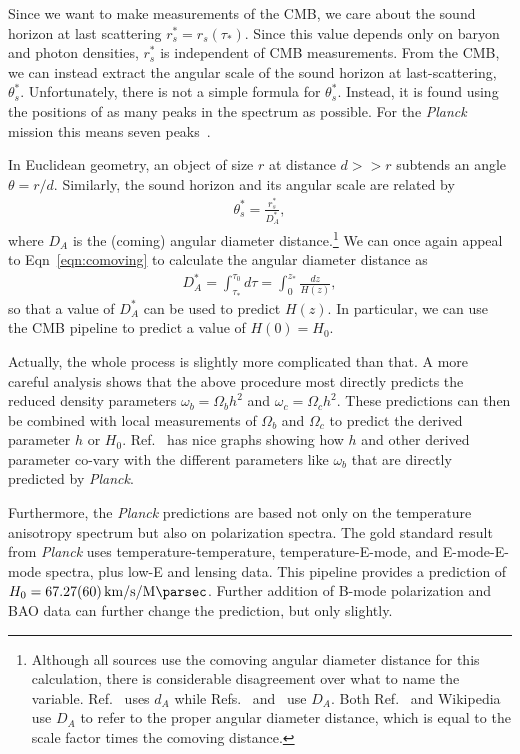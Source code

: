 \documentclass[12pt]{article}
\newcommand{\units}{\kilo\meter\per\second\per\mega\parsec}
\newcommand{\hnaught}[1]{\SI{#1}{\units}}
\newcommand{\Planck}[1]{\textit{Planck}}
\begin{document}
Since we want to make measurements of the CMB, we care about the sound horizon at last scattering $r_s^*=r_s(\tau_*)$. Since this value depends only on baryon and photon densities, $r^*_s$ is independent of CMB measurements. From the CMB, we can instead extract the angular scale of the sound horizon at last-scattering, $\theta_s^*$. Unfortunately, there is not a simple formula for $\theta_s^*$. Instead, it is found using the positions of as many peaks in the spectrum as possible. For the \textit{Planck} mission this means seven peaks~\cite{Planck2013, Planck2018}. 

In Euclidean geometry, an object of size $r$ at distance $d>>r$ subtends an angle $\theta = r/d$.
Similarly, the sound horizon and its angular scale are related by
\begin{align}
\theta_s^* = \frac{r_s^*}{D_A^*},
\end{align}
where $D_A$ is the (coming) angular diameter distance.\footnote{Although all sources use the comoving angular diameter distance for this calculation, there is considerable disagreement over what to name the variable. Ref.~\cite{Samtleben2007} uses $d_A$ while Refs.~\cite{Planck2013} and~\cite{DiValentino2021} use $D_A$. Both Ref.~\cite{Planck2018} and Wikipedia~\cite{Wikipedia} use $D_A$ to refer to the proper angular diameter distance, which is equal to the scale factor times the comoving distance.} We can once again appeal to Eqn~\ref{eqn:comoving} to calculate the angular diameter distance as~\cite{Samtleben2007, DiValentino2021}
\begin{align}
D_A^* = \int_{\tau_*}^{\tau_0}d\tau =  \int_0^{z_*}\frac{dz}{H(z)}, \label{eqn:distance}
\end{align}
so that a value of $D_A^*$ can be used to predict $H(z)$. In particular, we can use the CMB pipeline to predict a value of $H(0) = H_0$.

Actually, the whole process is slightly more complicated than that. A more careful analysis shows that the above procedure most directly predicts the reduced density parameters $\omega_b = \Omega_bh^2$ and $\omega_c = \Omega_c h^2$. These predictions can then be combined with local measurements of $\Omega_b$ and $\Omega_c$ to predict the derived parameter $h$ or $H_0$. Ref.~\cite{Planck2018} has nice graphs showing how $h$ and other derived parameter co-vary with the different parameters like $\omega_b$ that are directly predicted by \textit{Planck}. 

Furthermore, the \Planck{} predictions are based not only on the temperature anisotropy spectrum but also on polarization spectra. The gold standard result from \Planck{} uses temperature-temperature, temperature-E-mode, and E-mode-E-mode spectra, plus low-E and lensing data. This pipeline provides a prediction of ${H_0 = \hnaught{67.27 \pm 0.6}}$. Further addition of B-mode polarization and BAO data can further change the prediction, but only slightly.
\end{document}
